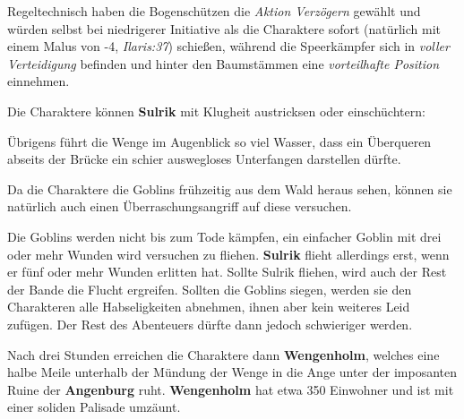 Regeltechnisch haben die Bogenschützen die \emph{Aktion Verzögern} gewählt und würden selbst bei niedrigerer Initiative als die Charaktere sofort (natürlich mit einem Malus von -4, \textit{Ilaris:37}) schießen, während die Speerkämpfer sich in \textit{voller Verteidigung} befinden und hinter den Baumstämmen eine \emph{vorteilhafte Position} einnehmen.

Die Charaktere können \textbf{Sulrik} mit Klugheit austricksen oder einschüchtern:



Übrigens führt die Wenge im Augenblick so viel Wasser, dass ein Überqueren abseits der Brücke ein schier auswegloses Unterfangen darstellen dürfte. 

Da die Charaktere die Goblins frühzeitig aus dem Wald heraus sehen, können sie natürlich auch einen Überraschungsangriff auf diese versuchen.



Die Goblins werden nicht bis zum Tode kämpfen, ein einfacher Goblin mit drei oder mehr Wunden wird versuchen zu fliehen.
\textbf{Sulrik} flieht  allerdings erst, wenn er fünf oder mehr Wunden erlitten hat.
Sollte Sulrik fliehen, wird auch der Rest der Bande die Flucht ergreifen.
Sollten die Goblins siegen, werden sie den Charakteren alle Habseligkeiten abnehmen, ihnen aber kein weiteres Leid zufügen.
Der Rest des Abenteuers dürfte dann jedoch schwieriger werden. 
%
%
%



Nach drei Stunden erreichen die Charaktere dann \textbf{Wengenholm}, welches eine halbe Meile unterhalb der Mündung der Wenge in die Ange unter der imposanten Ruine der \textbf{Angenburg} ruht.
\textbf{Wengenholm} hat etwa 350 Einwohner und ist mit einer soliden Palisade umzäunt.
	
